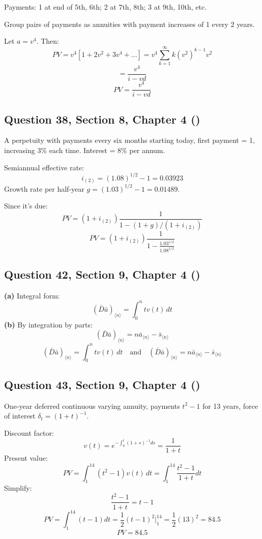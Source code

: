 \documentclass[12pt, a4paper]{article}
\newcommand{\angl}[1]{\langle #1 \rangle}
\begin{document}
Payments: 1 at end of 5th, 6th; 2 at 7th, 8th; 3 at 9th, 10th, etc.

Group pairs of payments as annuities with payment increases of 1 every 2 years.

Let \(a = v^4\). Then:
\[
PV = v^4 [1 + 2v^2 + 3v^4 + \dots] = v^4 \sum_{k=1}^{\infty} k (v^2)^{k-1} v^2
\]
\[
= \frac{v^4}{i - v d}
\]
\[
\boxed{PV = \frac{v^4}{i - v d}}
\]

\subsection*{Question 38, Section 8, Chapter 4  (\cite{toi3rd})}

A perpetuity with payments every six months starting today, first payment = 1, increasing 3\% each time.  
Interest = 8\% per annum.

Semiannual effective rate:
\[
i_{(2)} = (1.08)^{1/2} - 1 = 0.03923
\]
Growth rate per half-year \( g = (1.03)^{1/2} - 1 = 0.01489 \).

Since it’s due:
\[
PV = (1 + i_{(2)}) \frac{1}{1 - (1 + g)/(1 + i_{(2)})}
\]
\[
\boxed{PV = (1 + i_{(2)}) \frac{1}{1 - \frac{1.03^{1/2}}{1.08^{1/2}}}}
\]

\subsection*{Question 42, Section 9, Chapter 4  (\cite{toi3rd})}

\textbf{(a)}  
Integral form:
\[
(\bar{D}\bar{a})_{\angl{n}} = \int_0^n t v(t) \, dt
\]
\textbf{(b)}  
By integration by parts:
\[
(\bar{D}\bar{a})_{\angl{n}} = n \bar{a}_{\angl{n}} - \bar{s}_{\angl{n}}
\]
\[
\boxed{
(\bar{D}\bar{a})_{\angl{n}} = \int_0^n t v(t) \, dt 
\quad \text{and} \quad
(\bar{D}\bar{a})_{\angl{n}} = n\bar{a}_{\angl{n}} - \bar{s}_{\angl{n}}
}
\]

\subsection*{Question 43, Section 9, Chapter 4  (\cite{toi3rd})}

One-year deferred continuous varying annuity, payments \( t^2 - 1 \) for 13 years,  
force of interest \( \delta_t = (1 + t)^{-1} \).

Discount factor:
\[
v(t) = e^{-\int_0^t (1 + s)^{-1} ds} = \frac{1}{1 + t}
\]
Present value:
\[
PV = \int_1^{14} (t^2 - 1)v(t)\,dt = \int_1^{14} \frac{t^2 - 1}{1 + t} dt
\]
Simplify:
\[
\frac{t^2 - 1}{1 + t} = t - 1
\]
\[
PV = \int_1^{14} (t - 1)dt = \frac{1}{2}(t - 1)^2 \bigg|_1^{14} = \frac{1}{2}(13)^2 = 84.5
\]
\[
\boxed{PV = 84.5}
\]
\end{document}
